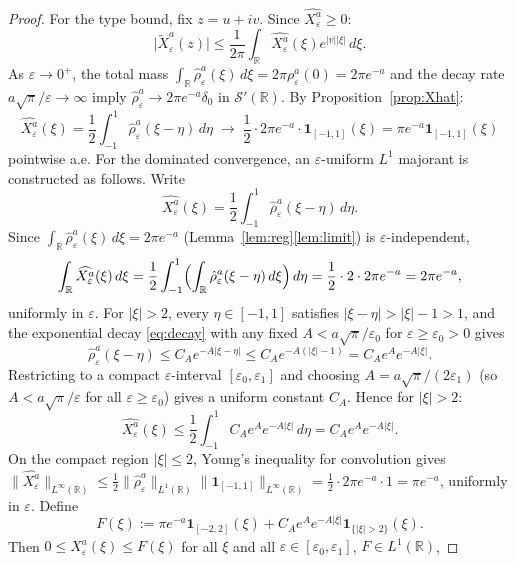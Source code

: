 \documentclass[12pt]{amsart}
\theoremstyle{remark}
\begin{document}
\begin{proof}
For the type bound, fix $z=u+iv$.  Since $\widehat{X_\varepsilon^a}\geq 0$:
\[
  \bigl|\tilde X_\varepsilon^a(z)\bigr|
  \leq\frac{1}{2\pi}\int_\mathbb{R}\widehat{X_\varepsilon^a}(\xi)e^{|v||\xi|}\,d\xi.
\]
As $\varepsilon\to 0^+$, the total mass
$\int_\mathbb{R}\hat\rho_\varepsilon^a(\xi)\,d\xi=2\pi\rho_\varepsilon^a(0)=2\pi e^{-a}$
and the decay rate $a\sqrt{\pi}/\varepsilon\to\infty$ imply
$\hat\rho_\varepsilon^a\to 2\pi e^{-a}\delta_0$ in $\mathcal{S}'(\mathbb{R})$.
By Proposition~\ref{prop:Xhat}:
\[
  \widehat{X_\varepsilon^a}(\xi)
  =\frac{1}{2}\int_{-1}^{1}\hat\rho_\varepsilon^a(\xi-\eta)\,d\eta
  \;\longrightarrow\;
  \frac{1}{2}\cdot 2\pi e^{-a}\cdot\mathbf{1}_{[-1,1]}(\xi)
  =\pi e^{-a}\mathbf{1}_{[-1,1]}(\xi)
\]
pointwise a.e.  For the dominated convergence, an $\varepsilon$-uniform $L^1$ majorant
is constructed as follows.  Write
\[
  \widehat{X_\varepsilon^a}(\xi)
  =\frac{1}{2}\int_{-1}^{1}\hat\rho_\varepsilon^a(\xi-\eta)\,d\eta.
\]
Since $\int_\mathbb{R}\hat\rho_\varepsilon^a(\xi)\,d\xi=2\pi e^{-a}$
(Lemma~\ref{lem:reg}\ref{lem:limit}) is $\varepsilon$-independent,
\[
  \int_\mathbb{R}\widehat{X_\varepsilon^a}(\xi)\,d\xi
  =\frac{1}{2}\int_{-1}^{1}\Bigl(\int_\mathbb{R}
   \hat\rho_\varepsilon^a(\xi-\eta)\,d\xi\Bigr)\,d\eta
  =\frac{1}{2}\cdot 2\cdot 2\pi e^{-a}
  =2\pi e^{-a},
\]
uniformly in $\varepsilon$.  For $|\xi|>2$, every $\eta\in[-1,1]$ satisfies
$|\xi-\eta|>|\xi|-1>1$, and the exponential decay
\eqref{eq:decay} with any fixed $A<a\sqrt{\pi}/\varepsilon_0$ for
$\varepsilon\geq\varepsilon_0>0$ gives
\[
  \hat\rho_\varepsilon^a(\xi-\eta)
  \leq C_A e^{-A|\xi-\eta|}
  \leq C_A e^{-A(|\xi|-1)}
  = C_A e^A e^{-A|\xi|}.
\]
Restricting to a compact $\varepsilon$-interval
$[\varepsilon_0,\varepsilon_1]$ and choosing $A=a\sqrt{\pi}/(2\varepsilon_1)$
(so $A<a\sqrt{\pi}/\varepsilon$ for all $\varepsilon\geq\varepsilon_0$)
gives a uniform constant $C_A$.  Hence for $|\xi|>2$:
\[
  \widehat{X_\varepsilon^a}(\xi)
  \leq\frac{1}{2}\int_{-1}^{1}C_A e^A e^{-A|\xi|}\,d\eta
  = C_A e^A e^{-A|\xi|}.
\]
On the compact region $|\xi|\leq 2$, Young's inequality for convolution
gives $\|\widehat{X_\varepsilon^a}\|_{L^\infty(\mathbb{R})}
\leq\tfrac12\|\hat\rho_\varepsilon^a\|_{L^1(\mathbb{R})}
\|\mathbf{1}_{[-1,1]}\|_{L^\infty(\mathbb{R})}
=\tfrac12\cdot 2\pi e^{-a}\cdot 1=\pi e^{-a}$, uniformly in $\varepsilon$.
Define
\[
  F(\xi):=\pi e^{-a}\mathbf{1}_{[-2,2]}(\xi)
          +C_A e^A e^{-A|\xi|}\mathbf{1}_{\{|\xi|>2\}}(\xi).
\]
Then $0\leq\widehat{X_\varepsilon^a}(\xi)\leq F(\xi)$ for all $\xi$
and all $\varepsilon\in[\varepsilon_0,\varepsilon_1]$, $F\in L^1(\mathbb{R})$,

\end{proof}
\end{document}
